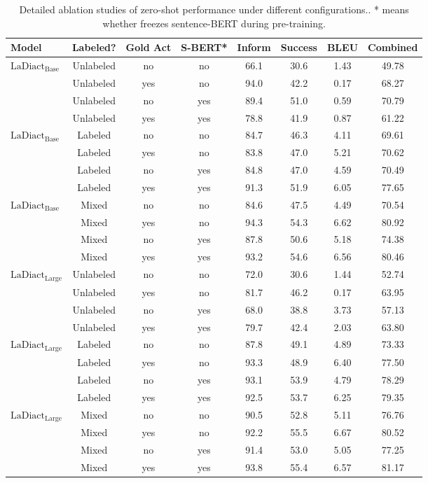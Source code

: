 \begin{table*}[h]
    \centering
    \begin{tabular}{l|c c c |c c c c }
    \toprule
    \textbf{Model} & \textbf{Labeled?} & \textbf{Gold Act} & \textbf{S-BERT*} & \textbf{Inform} & \textbf{Success} & \textbf{BLEU} & \textbf{Combined} \\
    \midrule
    $\text{LaDiact}_\text{Base}$ & Unlabeled & no & no & 66.1 & 30.6 & 1.43 & 49.78 \\
     & Unlabeled & yes & no & 94.0 & 42.2 & 0.17 & 68.27 \\
     & Unlabeled & no & yes & 89.4 & 51.0 & 0.59 & 70.79 \\
     & Unlabeled & yes & yes & 78.8 & 41.9 & 0.87 & 61.22 \\
    \midrule
    $\text{LaDiact}_\text{Base}$ & Labeled & no & no & 84.7 & 46.3 & 4.11 & 69.61 \\
     & Labeled & yes & no & 83.8 & 47.0 & 5.21 & 70.62 \\
     & Labeled & no & yes & 84.8 & 47.0 & 4.59 & 70.49 \\
     & Labeled & yes & yes & 91.3 & 51.9 & 6.05 & 77.65 \\
    \midrule
    $\text{LaDiact}_\text{Base}$ & Mixed & no & no & 84.6 & 47.5 & 4.49 & 70.54 \\
     & Mixed & yes & no & 94.3 & 54.3 & 6.62 & 80.92 \\
     & Mixed & no & yes & 87.8 & 50.6 & 5.18 & 74.38 \\
     & Mixed & yes & yes & 93.2 & 54.6 & 6.56 & 80.46 \\
    \midrule
    \midrule
    $\text{LaDiact}_\text{Large}$ & Unlabeled & no & no & 72.0 & 30.6 & 1.44 & 52.74 \\
     & Unlabeled & yes & no & 81.7 & 46.2 & 0.17 & 63.95 \\
     & Unlabeled & no & yes & 68.0 & 38.8 & 3.73 & 57.13 \\
     & Unlabeled & yes & yes & 79.7 & 42.4 & 2.03 & 63.80 \\
    \midrule
    $\text{LaDiact}_\text{Large}$ & Labeled & no & no & 87.8 & 49.1 & 4.89 & 73.33 \\
     & Labeled & yes & no & 93.3 & 48.9 & 6.40 & 77.50 \\
     & Labeled & no & yes & 93.1 & 53.9 & 4.79 & 78.29 \\
     & Labeled & yes & yes & 92.5 & 53.7 & 6.25 & 79.35 \\
    \midrule
    $\text{LaDiact}_\text{Large}$ & Mixed & no & no & 90.5 & 52.8 & 5.11 & 76.76 \\
     & Mixed & yes & no & 92.2 & 55.5 & 6.67 & 80.52 \\
     & Mixed & no & yes & 91.4 & 53.0 & 5.05 & 77.25 \\
     & Mixed & yes & yes & 93.8 & 55.4 & 6.57 & 81.17 \\
    \bottomrule
    \end{tabular}
    \caption{Detailed ablation studies of zero-shot performance under different configurations.. * means whether freezes sentence-BERT during pre-training.}
    \label{tab:result}
\end{table*}

